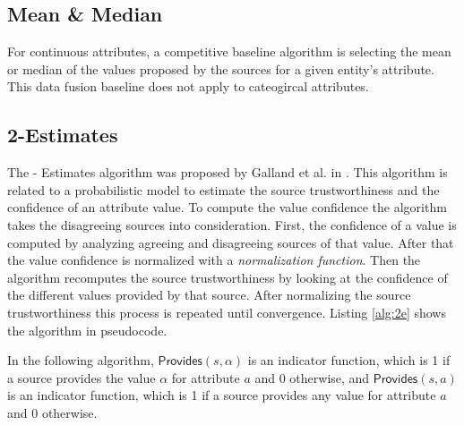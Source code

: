 \documentclass{acm_proc_article-sp}
\begin{document}
\subsection{Mean \& Median}

For continuous attributes, a competitive baseline algorithm is selecting the mean or median of the values proposed by the sources for a given entity's attribute. This data fusion baseline does not apply to cateogircal attributes. 

\subsection{2-Estimates}
The {- Estimates} algorithm was proposed by Galland et al. in \cite{galland:corro}. This algorithm is related to a probabilistic model to estimate the source trustworthiness and the confidence of an attribute value. To compute the value confidence the algorithm takes the disagreeing sources into consideration. First, the confidence of a value is computed by analyzing agreeing and disagreeing sources of that value. After that the value confidence is normalized with a \emph{normalization function}. Then the algorithm recomputes the source trustworthiness by looking at the confidence of the different values provided by that source. After normalizing the source trustworthiness this process is repeated until convergence. Listing \ref{alg:2e} shows the algorithm in pseudocode.

In the following algorithm, $\mathsf{Provides}(s,\alpha)$ is an indicator function, which is 1 if a source provides the value $\alpha$ for attribute $a$ and 0 otherwise, and $\mathsf{Provides}(s,a)$ is an indicator function, which is 1 if a source provides any value for attribute $a$ and 0 otherwise. 
\end{document}
